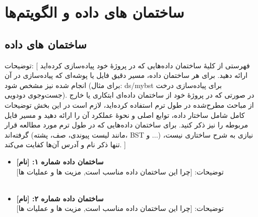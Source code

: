 \documentclass[12pt]{article}
\begin{document}
	\section{ساختمان های داده و الگویتم‌ها}
\subsection{ساختمان های داده}
توضیحات: [ فهرستی از کلیهٔ ساختمان داده‌هایی که در پروژهٔ خود پیاده‌سازی کرده‌اید ارائه دهید. برای هر ساختمان داده، مسیر دقیق فایل یا پوشه‌ای که پیاده‌سازی در آن انجام شده نیز مشخص شود (برای مثال: ds/mybst برای پیاده‌سازی درخت جست‌وجوی دودویی).
در صورتی که در پروژهٔ خود از ساختمان داده‌ای ابتکاری یا خارج از مباحث مطرح‌شده در طول ترم استفاده کرده‌اید، لازم است در این بخش توضیحات کامل شامل ساختار داده، توابع اصلی و نحوهٔ عملکرد آن را ارائه دهید و مسیر فایل مربوطه را نیز ذکر کنید.
برای ساختمان داده‌هایی که در طول ترم مورد مطالعه قرار گرفته‌اند (مانند لیست پیوندی، صف، پشته، BST و ...) نیازی به شرح ساختاری نیست، تنها ذکر نام و آدرس آن‌ها کفایت می‌کند. ]

\begin{itemize}[noitemsep]
	\item \textbf{ساختمان داده شماره ۱: [نام]}\\
	توضیحات: [چرا این ساختمان داده مناسب است, مزیت ها و عملیات ها]\\
	\lipsum[8]
	\\
	\item \textbf{ساختمان داده شماره ۲: [نام]}\\
	توضیحات: [چرا این ساختمان داده مناسب است, مزیت ها و عملیات ها]\\
	\lipsum[8]
\end{itemize}
\end{document}
